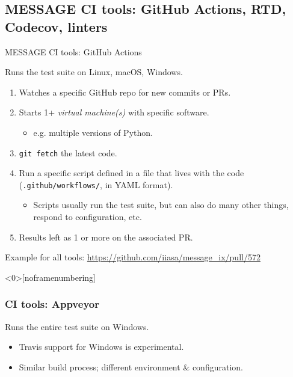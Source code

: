 \documentclass[12pt,aspectratio=169]{beamer}
\begin{document}
\subsection{MESSAGE CI tools: GitHub Actions, RTD, Codecov, linters}
\begin{frame}{MESSAGE CI tools: GitHub Actions}

  {\Large Runs the test suite on Linux, macOS, Windows.}

  \bigskip
  \begin{enumerate}
    \item Watches a specific GitHub repo for new commits or PRs.
    \item Starts 1+ \emph{virtual machine(s)} with specific software.
          \begin{itemize}
            \item e.g. multiple versions of Python.
          \end{itemize}
    \item \texttt{git fetch} the latest code.
    \item Run a specific script defined in a file that lives with the code
          (\texttt{.github/workflows/}, in YAML format).
          \begin{itemize}
            \item Scripts usually run the test suite, but can also do many other things, respond to configuration, etc.
          \end{itemize}
    \item Results left as 1 or more  on the associated PR.
  \end{enumerate}

  \bigskip
  Example for all tools: \url{https://github.com/iiasa/message_ix/pull/572}

\end{frame}

\begin{frame}<0>[noframenumbering]
  \frametitle{CI tools: Appveyor}

  {\Large Runs the entire test suite on Windows.}

  \bigskip
  \begin{itemize}
    \item Travis support for Windows is experimental.
    \item Similar build process; different environment \& configuration.
  \end{itemize}

\end{frame}
\end{document}

